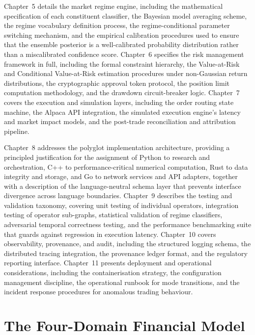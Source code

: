 \documentclass[12pt,openany]{book}
\numberwithin{equation}{chapter}
\theoremstyle{plain}
\theoremstyle{definition}
\theoremstyle{remark}
\begin{document}
Chapter~5 details the market regime engine, including the mathematical specification of each constituent classifier, the Bayesian model averaging scheme, the regime vocabulary definition process, the regime-conditional parameter switching mechanism, and the empirical calibration procedures used to ensure that the ensemble posterior is a well-calibrated probability distribution rather than a miscalibrated confidence score. Chapter~6 specifies the risk management framework in full, including the formal constraint hierarchy, the Value-at-Risk and Conditional Value-at-Risk estimation procedures under non-Gaussian return distributions, the cryptographic approval token protocol, the position limit computation methodology, and the drawdown circuit-breaker logic. Chapter~7 covers the execution and simulation layers, including the order routing state machine, the Alpaca API integration, the simulated execution engine's latency and market impact models, and the post-trade reconciliation and attribution pipeline.

Chapter~8 addresses the polyglot implementation architecture, providing a principled justification for the assignment of Python to research and orchestration, C++ to performance-critical numerical computation, Rust to data integrity and storage, and Go to network services and API adapters, together with a description of the language-neutral schema layer that prevents interface divergence across language boundaries. Chapter~9 describes the testing and validation taxonomy, covering unit testing of individual operators, integration testing of operator sub-graphs, statistical validation of regime classifiers, adversarial temporal correctness testing, and the performance benchmarking suite that guards against regression in execution latency. Chapter~10 covers observability, provenance, and audit, including the structured logging schema, the distributed tracing integration, the provenance ledger format, and the regulatory reporting interface. Chapter~11 presents deployment and operational considerations, including the containerisation strategy, the configuration management discipline, the operational runbook for mode transitions, and the incident response procedures for anomalous trading behaviour.

\chapter{The Four-Domain Financial Model}
\end{document}
